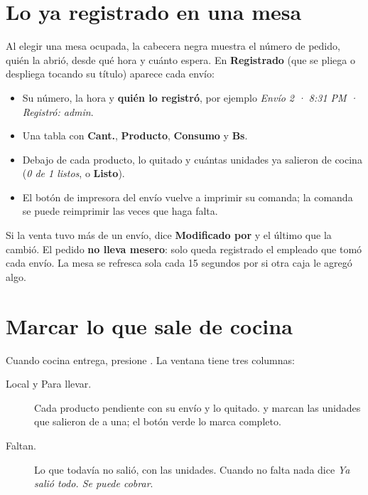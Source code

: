 \section{Lo ya registrado en una mesa}


Al elegir una mesa ocupada, la cabecera negra muestra el número de pedido, quién la abrió, desde qué hora y cuánto espera. En \textbf{Registrado} (que se pliega o despliega tocando su título) aparece cada envío:

\begin{itemize}
  \item Su número, la hora y \textbf{quién lo registró}, por ejemplo \textit{Envío 2 · 8:31 PM · Registró: admin}.
  \item Una tabla con \textbf{Cant.}, \textbf{Producto}, \textbf{Consumo} y \textbf{Bs}.
  \item Debajo de cada producto, lo quitado y cuántas unidades ya salieron de cocina (\textit{0 de 1 listos}, o \textbf{Listo}).
  \item El botón de impresora del envío vuelve a imprimir su comanda; la comanda se puede reimprimir las veces que haga falta.
\end{itemize}

Si la venta tuvo más de un envío, dice \textbf{Modificado por} y el último que la cambió. El pedido \textbf{no lleva mesero}: solo queda registrado el empleado que tomó cada envío. La mesa se refresca sola cada 15 segundos por si otra caja le agregó algo.

\section{Marcar lo que sale de cocina}


Cuando cocina entrega, presione . La ventana tiene tres columnas:

\begin{description}
  \item[Local y Para llevar.] Cada producto pendiente con su envío y lo quitado. \menos{} y \mas{} marcan las unidades que salieron de a una; el botón verde lo marca completo.
  \item[Faltan.] Lo que todavía no salió, con las unidades. Cuando no falta nada dice \textit{Ya salió todo. Se puede cobrar}.
\end{description}

